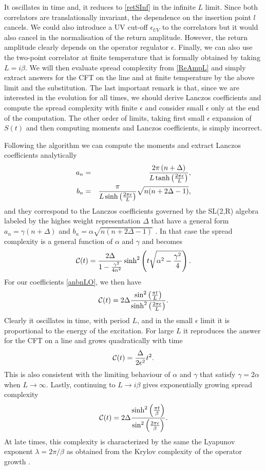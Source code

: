 \documentclass[aps,prl,twocolumn,showpacs,preprintnumbers,amsmath,amssymb]{revtex4-1}
\def\frac#1#2{{#1\over #2}}
\def\be{\begin{equation}}
\def\ee{\end{equation}}
\newcommand{\bea}{\begin{eqnarray}}
\newcommand{\eea}{\end{eqnarray}}
\begin{document}
It oscillates in time and, it reduces to \eqref{retSInf} in the infinite $L$ limit. Since both correlators are translationally invariant, the dependence on the insertion point $l$ cancels. We could also introduce a UV cut-off $\epsilon_{UV}$ to the correlators but it would also cancel in the normalisation of the return amplitude. However, the return amplitude clearly depends on the operator regulator $\epsilon$. Finally, we can also use the two-point correlator at finite temperature that is formally obtained by taking $L=i\beta$. We will then evaluate spread complexity from \eqref{ReAmpL} and simply extract answers for the CFT on the line and at finite temperature by the above limit and the substitution. The last important remark is that, since we are interested in the evolution for all times, we should derive Lanczos coefficients and compute the spread complexity with finite $\epsilon$ and consider small $\epsilon$ only at the end of the computation. The other order of limits, taking first small $\epsilon$ expansion of $S(t)$ and then computing moments and Lanczos coefficients, is simply incorrect.

Following the algorithm \cite{Balasubramanian:2022tpr,LanczosVish} we can compute the moments and extract Lanczos coefficients analytically
\bea
a_n&=&\frac{2\pi\,(n+\Delta)}{L\tanh\left(\frac{2\pi\epsilon}{L}\right)},\nonumber\\
b_n&=&\frac{\pi}{L\sinh\left(\frac{2\pi\epsilon}{L}\right)}\sqrt{n(n+2\Delta-1)},\label{anbnLO}
\eea
and they correspond to the Lanczos coefficients governed by the SL(2,R) algebra labeled by the highes weight representation $\Delta$  that have a general form $a_n=\gamma(n+\Delta)$ and $b_n=\alpha\sqrt{n(n+2\Delta-1)}$ \cite{Caputa:2021sib}. In that case the spread complexity is a general function of $\alpha$ and $\gamma$ and becomes \cite{Balasubramanian:2022tpr}
\be
\mathcal{C}(t)=\frac{2\Delta}{1-\frac{\gamma^2}{4\alpha^2}}\sinh^2\left(t\sqrt{\alpha^2-\frac{\gamma^2}{4}}\right).\label{GenComplSL2R}
\ee
For our coefficients \eqref{anbnLO}, we then have
\be
\mathcal{C}(t)=2\Delta\frac{\sin^2\left(\frac{\pi t}{L}\right)}{\sinh^2\left(\frac{2\pi \epsilon}{L}\right)}.
\ee
Clearly it oscillates in time, with period $L$, and in the small $\epsilon$ limit it is proportional to the energy of the excitation. For large $L$ it reproduces the answer for the CFT on a line and grows quadratically with time
\be
\mathcal{C}(t)=\frac{\Delta }{2\epsilon^2}t^2.
\ee
This is also consistent with the limiting behaviour of $\alpha$ and $\gamma$ that satisfy $\gamma=2\alpha$ when $L\to\infty$. Lastly, continuing to $L\to i\beta$ gives exponentially growing spread complexity
\be
\mathcal{C}(t)=2\Delta\frac{\sinh^2\left(\frac{\pi t}{\beta}\right)}{\sin^2\left(\frac{2\pi \epsilon}{\beta}\right)}.
\ee
At late times, this complexity is characterized by the same the Lyapunov exponent $\lambda=2\pi/\beta$ as obtained from the Krylov complexity of the operator growth \cite{Parker:2018yvk}.
\end{document}
